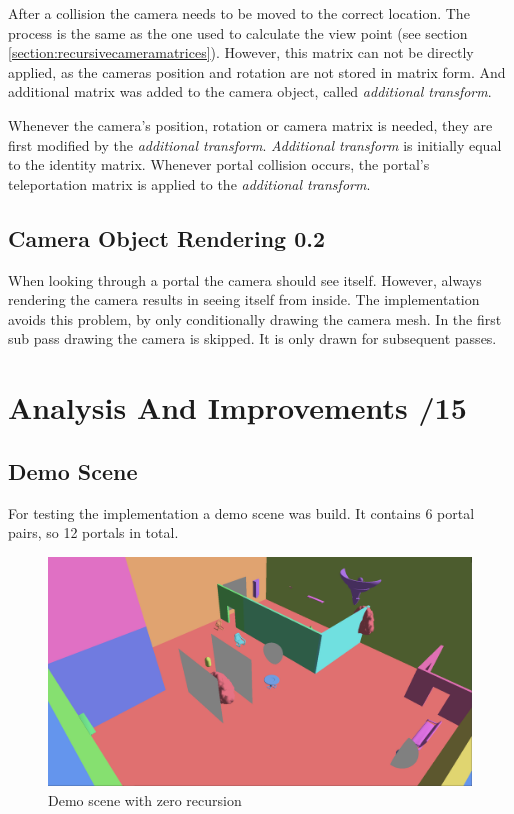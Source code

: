 After a collision the camera needs to be moved to the correct location. The process is the same as the one used to calculate the view point (see section \ref{section:recursivecameramatrices}). However, this matrix can not be directly applied, as the cameras position and rotation are not stored in matrix form.
And additional matrix was added to the camera object, called \textit{additional transform}.

Whenever the camera's position, rotation or camera matrix is needed, they are first modified by the \textit{additional transform}. \textit{Additional transform} is initially equal to the identity matrix. Whenever portal collision occurs, the portal's teleportation matrix is applied to the \textit{additional transform}.



\subsection{Camera Object Rendering 0.2}
When looking through a portal the camera should see itself. However, always rendering the camera results in seeing itself from inside. The implementation avoids this problem, by only conditionally drawing the camera mesh. In the first sub pass drawing the camera is skipped. It is only drawn for subsequent passes.




\section{Analysis And Improvements /15}

\subsection{Demo Scene}

For testing the implementation a demo scene was build. It contains 6 portal pairs, so 12 portals in total.

\begin{figure}[H]
	\centering
	\includegraphics[width=\linewidth]{images/portals.png}
	\caption{Demo scene with zero recursion}
	\label{fig:demodisabled}
\end{figure}


